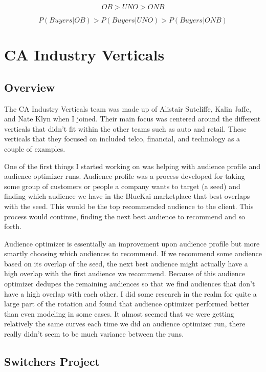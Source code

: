 \documentclass[paper=a4, fontsize=11pt]{scrartcl} %
\numberwithin{equation}{section} %
\numberwithin{figure}{section} %
\numberwithin{table}{section} %
\begin{document}
\begin{equation}
OB > UNO > ONB
\end{equation}

\begin{equation}
P(Buyers | OB) > P(Buyers | UNO) > P(Buyers | ONB)
\end{equation}


\section{CA Industry Verticals}
\subsection{Overview}

The CA Industry Verticals team was made up of Alistair Sutcliffe, Kalin Jaffe, and Nate Klyn when I joined. Their main focus was centered around the different verticals that didn't fit within the other teams such as auto and retail. These verticals that they focused on included telco, financial, and technology as a couple of examples.

One of the first things I started working on was helping with audience profile and audience optimizer runs. Audience profile was a process developed for taking some group of customers or people a company wants to target (a seed) and finding which audience we have in the BlueKai marketplace that best overlaps with the seed. This would be the top recommended audience to the client. This process would continue, finding the next best audience to recommend and so forth.

Audience optimizer is essentially an improvement upon audience profile but more smartly choosing which audiences to recommend. If we recommend some audience based on its overlap of the seed, the next best audience might actually have a high overlap with the first audience we recommend. Because of this audience optimizer dedupes the remaining audiences so that we find audiences that don't have a high overlap with each other. I did some research in the realm for quite a large part of the rotation and found that audience optimizer performed better than even modeling in some cases. It almost seemed that we were getting relatively the same curves each time we did an audience optimizer run, there really didn't seem to be much variance between the runs.

\subsection{Switchers Project}
\end{document}
